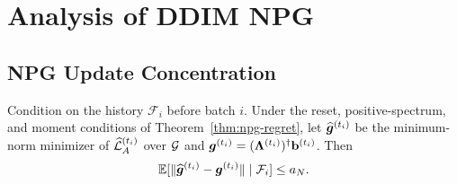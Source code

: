 \section[Analysis of Deterministic-Flow Natural Policy Gradient]{Analysis of DDIM NPG}
\label{app:diffusion-npg}

\subsection[Natural Policy Gradient Update Concentration]{NPG Update Concentration}

\begin{lem}
Condition on the history $\mathcal F_i$ before batch $i$. Under the reset,
positive-spectrum, and moment conditions of Theorem~\ref{thm:npg-regret}, let
$\widehat{\bm{g}}^{(t_i)}$ be the minimum-norm minimizer of
$\widehat{{\mathcal{L}}}_A^{(t_i)}$ over ${\mathcal{G}}$ and
$\bm{g}^{(t_i)}=(\boldsymbol{\Lambda}^{(t_i)})^\dagger\mathbf{b}^{(t_i)}$.
Then
\[
\mathbb{E}[\|\widehat{\bm{g}}^{(t_i)}-\bm{g}^{(t_i)}\|\mid\mathcal F_i]\leq a_N.
\]
\label{lem:least-squares-npg}
\end{lem}
